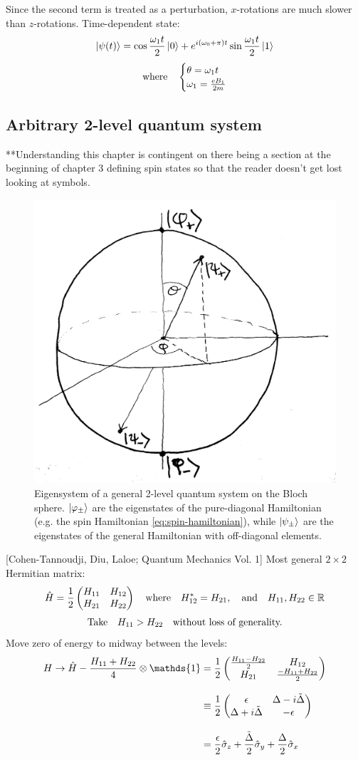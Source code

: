 \documentclass[12pt]{article}
\newcommand*\id{\mathds{1}}
\begin{document}
Since the second term is treated as a perturbation, $x$-rotations are much
slower than $z$-rotations. Time-dependent state:
\[\ket{\psi(t)} = \cos{\frac{\omega_1t}{2}}\ket{0}
+ e^{i(\omega_0 + \pi)t}\sin{\frac{\omega_1t}{2}}\ket{1}\]
\[\qq{where}\begin{cases}
    \theta = \omega_1t\\
    \omega_1 = \frac{eB_1}{2m}
\end{cases}\]

\subsection{Arbitrary 2-level quantum system}%
**Understanding this chapter is contingent on there being a section at the beginning of chapter 3 defining spin states so that the reader doesn't get lost looking at symbols. 
\label{sec:arbitrary-2-level-system}
\begin{figure}[htpb]
    \centering
    \includegraphics[width=0.5\linewidth]{arbitrary-2-level-system.jpg}
    \caption{Eigensystem of a general 2-level quantum system on the Bloch
        sphere. $\ket{\varphi_\pm}$ are the eigenstates of the pure-diagonal
        Hamiltonian (e.g. the spin Hamiltonian \eqref{eq:spin-hamiltonian}),
        while $\ket{\psi_\pm}$ are the eigenstates of the general Hamiltonian
        with off-diagonal elements.}%
    \label{fig:arbitrary-2-level-system}
\end{figure}
[Cohen-Tannoudji, Diu, Laloe; Quantum Mechanics Vol. 1]
Most general $2\times 2$ Hermitian matrix:
\[\hat{H} = \frac{1}{2} \pmqty{\xmat*{H}{2}{2}}
\qq{where} H_{12}^* = H_{21}, \qq{and} H_{11}, H_{22} \in \mathbb{R}\]
\[\qq{Take} H_{11} > H_{22} \qq{without loss of generality.}\]
Move zero of energy to midway between the levels:
\begin{alignat}{1}
    H \rightarrow \hat{H} -\frac{H_{11} + H_{22}}{4}\otimes\id
    &= \frac{1}{2}
    \pmqty{\frac{H_{11}-H_{22}}{2}&H_{12}\\H_{21}&\frac{-H_{11}+H_{22}}{2}}
    \\[2ex] &\equiv \frac{1}{2}
    \pmqty{\epsilon&\Delta-i\tilde{\Delta}\\ \Delta+i\tilde{\Delta}&-\epsilon}
    \\[2ex]
    &= \frac{\epsilon}{2} \hat{\sigma}_z
        + \frac{\tilde{\Delta}}{2}\hat{\sigma}_y
        + \frac{\Delta}{2}\hat{\sigma}_x
\end{alignat}
\end{document}
